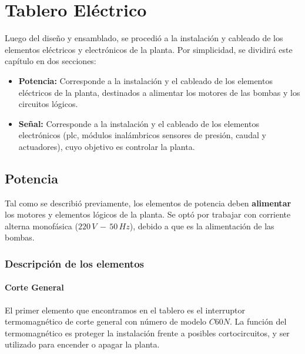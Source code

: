 \chapter{Tablero Eléctrico}
\label{ch:tablero}

Luego del diseño y ensamblado, se procedió a la instalación
y cableado de los elementos eléctricos y electrónicos de la planta. 
Por simplicidad, se dividirá este capítulo en 
dos secciones:
\begin{itemize}
 \item \textbf{Potencia:} Corresponde a la instalación y el cableado
 de los elementos eléctricos de la planta, destinados a alimentar los motores de 
 las bombas y los circuitos lógicos.
 \item \textbf{Señal:} Corresponde a la instalación y el cableado
 de los elementos electrónicos (\gls{plc}, módulos inalámbricos
 sensores de presión, caudal y actuadores), 
 cuyo objetivo es controlar la planta.
\end{itemize}

\section{Potencia}
\label{sec:Potencia}
Tal como se describió previamente, los elementos de potencia deben 
\textbf{alimentar} los motores y elementos lógicos de la planta.
Se optó por trabajar con corriente alterna monofásica ($220\,V\,-\,50\,Hz$), 
debido a que es la alimentación de las bombas.

\subsection{Descripción de los elementos}
\subsubsection{Corte General}
El primer elemento que encontramos en el tablero es el interruptor 
termomagnético de corte general
con número de modelo $C60 N$.
La función del termomagnético es proteger la instalación frente a posibles
cortocircuitos, y ser utilizado para encender o apagar la planta.
